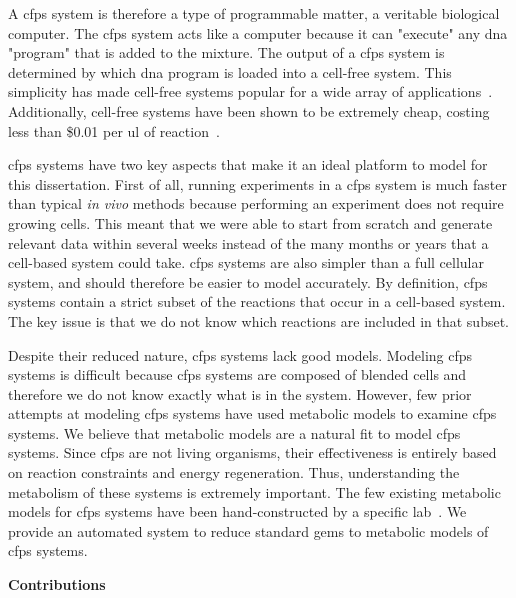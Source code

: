 A \gls{cfps} system is therefore a type of programmable matter, a veritable biological computer.
The \gls{cfps} system acts like a computer because it can "execute" any \gls{dna} "program" that is added to the mixture.
The output of a \gls{cfps} system is determined by which \gls{dna} program is loaded into a cell-free system.
This simplicity has made cell-free systems popular for a wide array of applications~\cite{hodgman2012cell, rollin2013new, carlson2012cell}.
Additionally, cell-free systems have been shown to be extremely cheap, costing less than \$0.01 per \gls{ul} of reaction~\cite{murray2013cost}.

\gls{cfps} systems have two key aspects that make it an ideal platform to model for this dissertation.
First of all, running experiments in a \gls{cfps} system is much faster than typical \textit{in vivo} methods because performing an experiment does not require growing cells.
This meant that we were able to start from scratch and generate relevant data within several weeks instead of the many months or years that a cell-based system could take.
\gls{cfps} systems are also simpler than a full cellular system, and should therefore be easier to model accurately.
By definition, \gls{cfps} systems contain a strict subset of the reactions that occur in a cell-based system.
The key issue is that we do not know which reactions are included in that subset.

Despite their reduced nature, \gls{cfps} systems lack good models.
Modeling \gls{cfps} systems is difficult because \gls{cfps} systems are composed of blended cells and therefore we do not know exactly what is in the system.
However, few prior attempts at modeling \gls{cfps} systems have used metabolic models to examine \gls{cfps} systems.
We believe that metabolic models are a natural fit to model \gls{cfps} systems.
Since \gls{cfps} are not living organisms, their effectiveness is entirely based on reaction constraints and energy regeneration.
Thus, understanding the metabolism of these systems is extremely important.
The few existing metabolic models for \gls{cfps} systems have been hand-constructed by a specific lab~\cite{bujara2012silico, vilkhovoy2017sequence}.
We provide an automated system to reduce standard \glspl{gem} to metabolic models of \gls{cfps} systems.

\textbf{Contributions}


